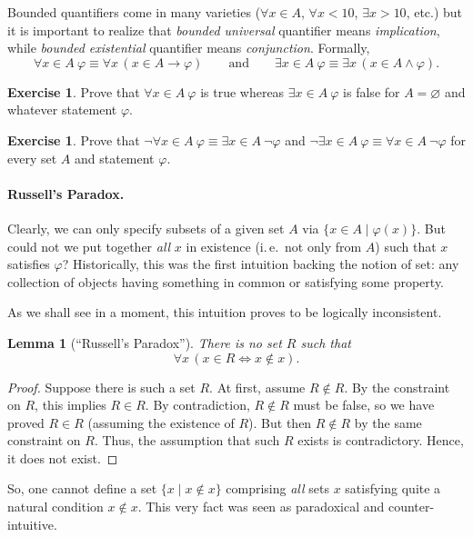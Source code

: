 \documentclass[12pt,notitlepage]{article}
\theoremstyle{plain}
\newtheorem{lemma}[thm]{Lemma}
\theoremstyle{definition}
\newtheorem{exc}[thm]{Exercise}
\theoremstyle{plain}
\newcommand{\void}{\varnothing}
\renewcommand{\phi}{\varphi}
\newcommand{\1}{\mathbf{1}}
\newcommand{\0}{\mathbf{0}}
\begin{document}
Bounded quantifiers come in many varieties ($\forall x \in A$, $\forall x < 10$, $\exists x > 10$, etc.) but it is important to realize that \emph{bounded universal} quantifier means \emph{implication}, while \emph{bounded existential} quantifier means \emph{conjunction}. Formally,
$$\forall x \in A\ \phi \equiv \forall x\, (x \in A \to \phi)\qquad\mbox{and}\qquad\exists x \in A\ \phi \equiv \exists x\, (x \in A \wedge \phi).$$
\begin{exc}
Prove that $\forall x \in A\ \phi$ is true whereas $\exists x \in A\ \phi$ is false for $A = \void$ and whatever statement $\phi$.
\end{exc}
\begin{exc}
Prove that $\neg\forall x \in A\ \phi \equiv \exists x\in A\ \neg\phi$ and $\neg\exists x \in A\ \phi \equiv \forall x\in A\ \neg\phi$ for every set $A$ and statement $\phi$.
\end{exc}

\paragraph{Russell's Paradox.} Clearly, we can only specify subsets of a given set $A$ via $\{x \in A \mid \phi(x) \}$. But could not we put together \emph{all} $x$ in existence (i.\,e.\ not only from $A$) such that $x$ satisfies $\phi$? Historically, this was the first intuition backing the notion of set: any collection of objects having something in common or satisfying some property.

As we shall see in a moment, this intuition proves to be logically inconsistent. 
\begin{lemma}[``Russell's Paradox'']
There is no set $R$ such that
$$\forall x\, (x \in R \iff x \notin x).$$
\end{lemma}
\begin{proof}
Suppose there is such a set $R$. At first, assume $R \notin R$. By the constraint on $R$, this implies $R \in R$. By contradiction, $R \notin R$ must be false, so we have proved $R \in R$ (assuming the existence of $R$). But then $R \notin R$ by the same constraint on $R$. Thus, the assumption that such $R$ exists is contradictory. Hence, it does not exist.
\end{proof}

So, one cannot define a set $\{x \mid x \notin x \}$ comprising \emph{all} sets $x$ satisfying quite a natural condition $x \notin x$. This very fact was seen as paradoxical and counter-intuitive.
\end{document}
